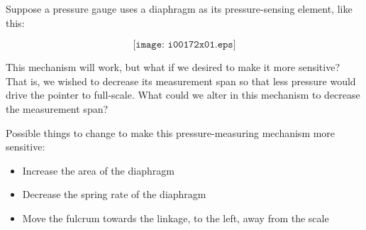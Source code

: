 

Suppose a pressure gauge uses a diaphragm as its pressure-sensing element, like this:

$$\texttt{[image: i00172x01.eps]}$$

This mechanism will work, but what if we desired to make it more sensitive?  That is, we wished to decrease its measurement span so that less pressure would drive the pointer to full-scale.  What could we alter in this mechanism to decrease the measurement span?







Possible things to change to make this pressure-measuring mechanism more sensitive:

\begin{itemize}
\item{} Increase the area of the diaphragm
\item{} Decrease the spring rate of the diaphragm
\item{} Move the fulcrum towards the linkage, to the left, away from the scale
\end{itemize}












